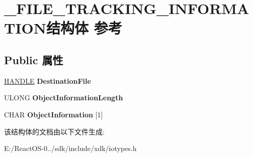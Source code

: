 \hypertarget{struct___f_i_l_e___t_r_a_c_k_i_n_g___i_n_f_o_r_m_a_t_i_o_n}{}\section{\+\_\+\+F\+I\+L\+E\+\_\+\+T\+R\+A\+C\+K\+I\+N\+G\+\_\+\+I\+N\+F\+O\+R\+M\+A\+T\+I\+O\+N结构体 参考}
\label{struct___f_i_l_e___t_r_a_c_k_i_n_g___i_n_f_o_r_m_a_t_i_o_n}
\subsection*{Public 属性}
\begin{DoxyCompactItemize}
\item 
\mbox{\label{struct___f_i_l_e___t_r_a_c_k_i_n_g___i_n_f_o_r_m_a_t_i_o_n_adc49a43602792821edadee7792bb947b}} 
\hyperlink{interfacevoid}{H\+A\+N\+D\+LE} {\bfseries Destination\+File}
\item 
\mbox{\label{struct___f_i_l_e___t_r_a_c_k_i_n_g___i_n_f_o_r_m_a_t_i_o_n_aaff18d0bffd1687a76c6041d30a71b12}} 
U\+L\+O\+NG {\bfseries Object\+Information\+Length}
\item 
\mbox{\label{struct___f_i_l_e___t_r_a_c_k_i_n_g___i_n_f_o_r_m_a_t_i_o_n_a6611175d2012772ad25a19dd3b59ce52}} 
C\+H\+AR {\bfseries Object\+Information} \mbox{[}1\mbox{]}
\end{DoxyCompactItemize}


该结构体的文档由以下文件生成\+:\begin{DoxyCompactItemize}
\item 
E\+:/\+React\+O\+S-\/0../sdk/include/xdk/iotypes.\+h\end{DoxyCompactItemize}
